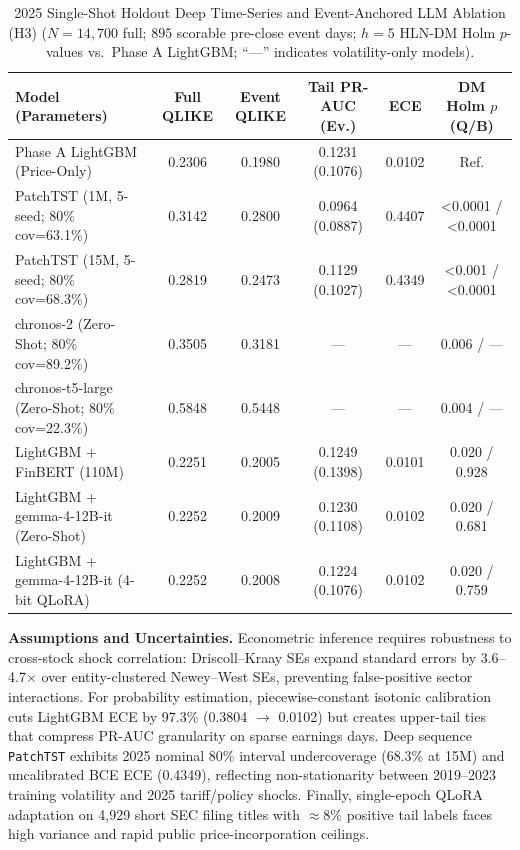 \documentclass[11pt,a4paper]{article}
\begin{document}
\begin{table}[!htb]
\centering
\caption{2025 Single-Shot Holdout Deep Time-Series and Event-Anchored LLM Ablation (H3) ($N=14{,}700$ full; $895$ scorable pre-close event days; $h=5$ HLN-DM Holm $p$-values vs.\ Phase A LightGBM; ``---'' indicates volatility-only models).}
\label{tab:phase_b_summary}
\scriptsize
\setlength{\tabcolsep}{3.5pt}
\begin{tabular}{lccccc}
\toprule
Model (Parameters) & Full QLIKE & Event QLIKE & Tail PR-AUC (Ev.) & ECE & DM Holm $p$ (Q/B) \\
\midrule
Phase A LightGBM (Price-Only) & 0.2306 & 0.1980 & 0.1231 (0.1076) & 0.0102 & Ref. \\
PatchTST (1M, 5-seed; 80\% cov=63.1\%) & 0.3142 & 0.2800 & 0.0964 (0.0887) & 0.4407 & <0.0001 / <0.0001 \\
PatchTST (15M, 5-seed; 80\% cov=68.3\%) & 0.2819 & 0.2473 & 0.1129 (0.1027) & 0.4349 & <0.001 / <0.0001 \\
chronos-2 (Zero-Shot; 80\% cov=89.2\%) & 0.3505 & 0.3181 & --- & --- & 0.006 / --- \\
chronos-t5-large (Zero-Shot; 80\% cov=22.3\%) & 0.5848 & 0.5448 & --- & --- & 0.004 / --- \\
LightGBM + FinBERT (110M) & 0.2251 & 0.2005 & 0.1249 (0.1398) & 0.0101 & 0.020 / 0.928 \\
LightGBM + gemma-4-12B-it (Zero-Shot) & 0.2252 & 0.2009 & 0.1230 (0.1108) & 0.0102 & 0.020 / 0.681 \\
LightGBM + gemma-4-12B-it (4-bit QLoRA) & 0.2252 & 0.2008 & 0.1224 (0.1076) & 0.0102 & 0.020 / 0.759 \\
\bottomrule
\end{tabular}
\end{table}


\textbf{Assumptions and Uncertainties.} Econometric inference requires
robustness to cross-stock shock correlation: Driscoll--Kraay SEs expand
standard errors by 3.6--4.7$\times$ over entity-clustered Newey--West SEs,
preventing false-positive sector interactions. For probability estimation,
piecewise-constant isotonic calibration cuts LightGBM ECE by
97.3\% (0.3804 $\to$ 0.0102) but
creates upper-tail ties that compress PR-AUC granularity on sparse earnings
days. Deep sequence \texttt{PatchTST} exhibits 2025 nominal 80\% interval
undercoverage (68.3\% at 15M) and uncalibrated BCE ECE (0.4349), reflecting
non-stationarity between 2019--2023 training volatility and 2025 tariff/policy
shocks. Finally, single-epoch QLoRA adaptation on 4,929 short SEC filing
titles with $\approx 8\%$ positive tail labels faces high variance and rapid
public price-incorporation ceilings.
\end{document}
